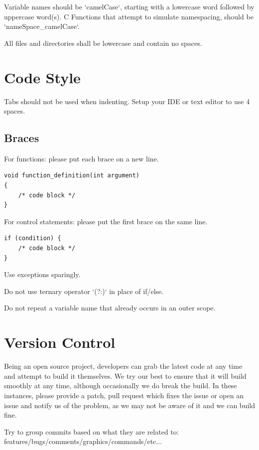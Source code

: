 \documentclass{report}
\begin{document}
Variable names should be `camelCase`, starting with a lowercase word followed by uppercase word(s).
C Functions that attempt to simulate namespacing, should be `nameSpace\_camelCase`.

All files and directories shall be lowercase and contain no spaces.

\section{Code Style}

Tabs should not be used when indenting. Setup your IDE or text editor to use 4 spaces.

\subsection{Braces}

For functions: please put each brace on a new line.

\begin{verbatim}
void function_definition(int argument)
{
    /* code block */
}
\end{verbatim}

For control statements: please put the first brace on the same line.

\begin{verbatim}
if (condition) {
    /* code block */    
}
\end{verbatim}

Use exceptions sparingly.

Do not use ternary operator `(?:)` in place of if/else.

Do not repeat a variable name that already occurs in an outer scope.

\section{Version Control}

Being an open source project, developers can grab the latest code at any time
and attempt to build it themselves. We try our best to ensure that it will build smoothly
at any time, although occasionally we do break the build. In these instances,
please provide a patch, pull request which fixes the issue or open an issue and
notify us of the problem, as we may not be aware of it and we can build fine.

Try to group commits based on what they are related to: features/bugs/comments/graphics/commands/etc...
\end{document}
